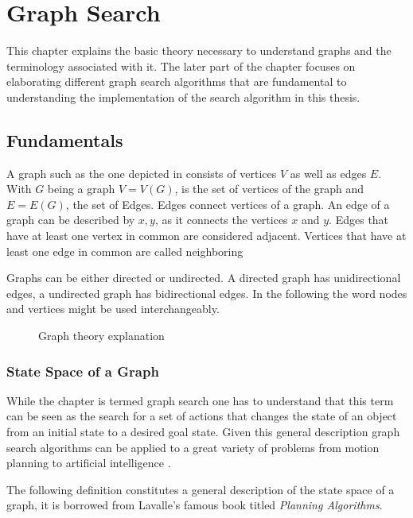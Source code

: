 \chapter{Graph Search}
\label{chap:graphSearch}
This chapter explains the basic theory necessary to understand graphs and the terminology associated with it. The later part of the chapter focuses on elaborating different graph search algorithms that are fundamental to understanding the implementation of the search algorithm in this thesis.

\section{Fundamentals}
A graph such as the one depicted in  consists of vertices $V$ as well as edges $E$. With $G$ being a graph $V = V(G)$, is the set of vertices of the graph and $E = E(G)$, the set of Edges. Edges connect vertices of a graph. An edge of a graph can be described by ${x,y}$, as it connects the vertices $x$ and $y$. Edges that have at least one vertex in common are considered adjacent. Vertices that have at least one edge in common are called neighboring \cite{Bollobas.1979}

Graphs can be either directed or undirected. A directed graph has unidirectional edges, a undirected graph has bidirectional edges. In the following the word nodes and vertices might be used interchangeably.

\begin{figure}[h]
    \caption{Graph theory explanation}
    \label{fig:graph}
\end{figure}

\subsection{State Space of a Graph}
While the chapter is termed graph search one has to understand that this term can be seen as the search for a set of actions that changes the state of an object from an initial state to a desired goal state. Given this general description graph search algorithms can be applied to a great variety of problems from motion planning to artificial intelligence \cite{LaValle.2006}.

The following definition constitutes a general description of the state space of a graph, it is borrowed from Lavalle's famous book titled \emph{Planning Algorithms}. 

